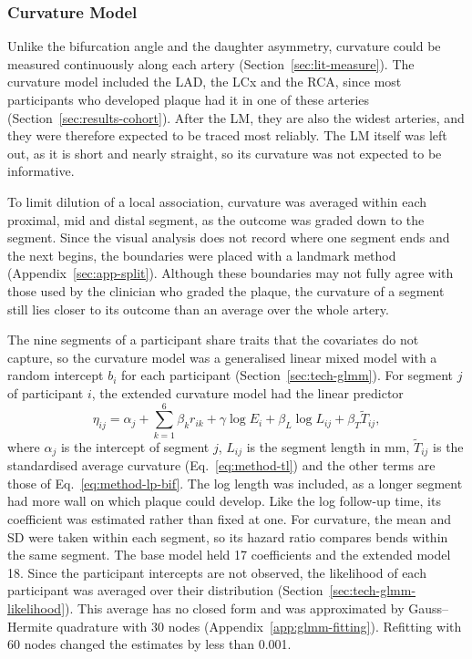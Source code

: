 \subsubsection{Curvature Model}
\label{sec:method-curvature-model}

\label{sec:method-split}%
\label{sec:method-split-validation}%
Unlike the bifurcation angle and the daughter asymmetry, curvature could be measured continuously along each artery (Section~\ref{sec:lit-measure}).
The curvature model included the LAD, the LCx and the RCA, since most participants who developed plaque had it in one of these arteries (Section~\ref{sec:results-cohort}).
After the LM, they are also the widest arteries, and they were therefore expected to be traced most reliably.
The LM itself was left out, as it is short and nearly straight, so its curvature was not expected to be informative.

To limit dilution of a local association, curvature was averaged within each proximal, mid and distal segment, as the outcome was graded down to the segment.
Since the visual analysis does not record where one segment ends and the next begins, the boundaries were placed with a landmark method (Appendix~\ref{sec:app-split}).
Although these boundaries may not fully agree with those used by the clinician who graded the plaque, the curvature of a segment still lies closer to its outcome than an average over the whole artery.

\label{sec:method-estimation}%
The nine segments of a participant share traits that the covariates do not capture, so the curvature model was a generalised linear mixed model with a random intercept $b_i$ for each participant (Section~\ref{sec:tech-glmm}).
For segment $j$ of participant $i$, the extended curvature model had the linear predictor
\begin{equation}
  \eta_{ij} = \alpha_j + \sum_{k=1}^{6} \beta_k r_{ik} + \gamma \log E_i + \beta_L \log L_{ij} + \beta_T \tilde{T}_{ij} ,
  \label{eq:method-lp}
\end{equation}
where $\alpha_j$ is the intercept of segment $j$, $L_{ij}$ is the segment length in mm, $\tilde{T}_{ij}$ is the standardised average curvature (Eq.~\eqref{eq:method-tl}) and the other terms are those of Eq.~\eqref{eq:method-lp-bif}.
The log length was included, as a longer segment had more wall on which plaque could develop.
Like the log follow-up time, its coefficient was estimated rather than fixed at one.
For curvature, the mean and SD were taken within each segment, so its hazard ratio compares bends within the same segment.
The base model held 17 coefficients and the extended model 18.
Since the participant intercepts are not observed, the likelihood of each participant was averaged over their distribution (Section~\ref{sec:tech-glmm-likelihood}).
This average has no closed form and was approximated by Gauss--Hermite quadrature with 30 nodes (Appendix~\ref{app:glmm-fitting}).
Refitting with 60 nodes changed the estimates by less than 0.001.


